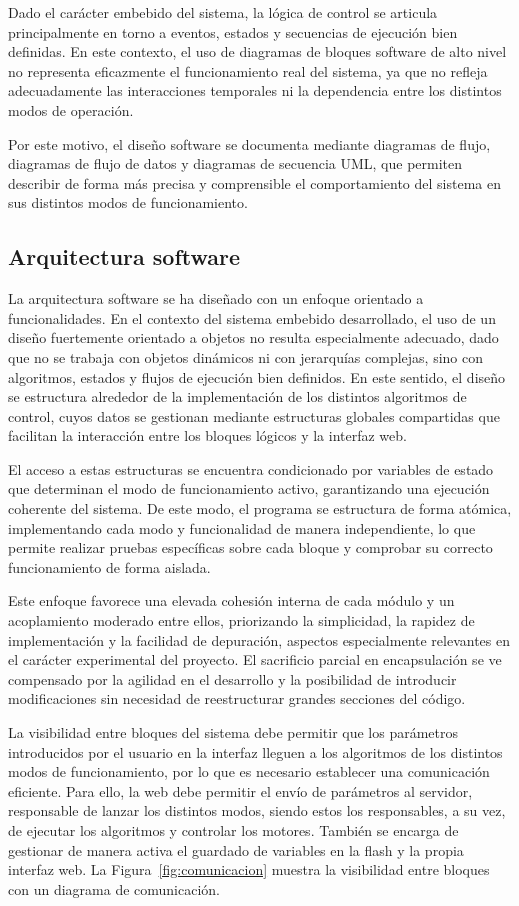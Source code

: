 Dado el carácter embebido del sistema, la lógica de control se articula principalmente en torno a eventos, estados y secuencias de ejecución bien definidas. En este contexto, el uso de diagramas de bloques software de alto nivel no representa eficazmente el funcionamiento real del sistema, ya que no refleja adecuadamente las interacciones temporales ni la dependencia entre los distintos modos de operación.

Por este motivo, el diseño software se documenta mediante diagramas de flujo, diagramas de flujo de datos y diagramas de secuencia UML, que permiten describir de forma más precisa y comprensible el comportamiento del sistema en sus distintos modos de funcionamiento.

\subsection{Arquitectura software}
La arquitectura software se ha diseñado con un enfoque orientado a funcionalidades. En el contexto del sistema embebido desarrollado, el uso de un diseño fuertemente orientado a objetos no resulta especialmente adecuado, dado que no se trabaja con objetos dinámicos ni con jerarquías complejas, sino con algoritmos, estados y flujos de ejecución bien definidos. En este sentido, el diseño se estructura alrededor de la implementación de los distintos algoritmos de control, cuyos datos se gestionan mediante estructuras globales compartidas que facilitan la interacción entre los bloques lógicos y la interfaz web.

El acceso a estas estructuras se encuentra condicionado por variables de estado que determinan el modo de funcionamiento activo, garantizando una ejecución coherente del sistema. De este modo, el programa se estructura de forma atómica, implementando cada modo y funcionalidad de manera independiente, lo que permite realizar pruebas específicas sobre cada bloque y comprobar su correcto funcionamiento de forma aislada.

Este enfoque favorece una elevada cohesión interna de cada módulo y un acoplamiento moderado entre ellos, priorizando la simplicidad, la rapidez de implementación y la facilidad de depuración, aspectos especialmente relevantes en el carácter experimental del proyecto. El sacrificio parcial en encapsulación se ve compensado por la agilidad en el desarrollo y la posibilidad de introducir modificaciones sin necesidad de reestructurar grandes secciones del código.

La visibilidad entre bloques del sistema debe permitir que los parámetros introducidos por el usuario en la interfaz lleguen a los algoritmos de los distintos modos de funcionamiento, por lo que es necesario establecer una comunicación eficiente. Para ello, la web debe permitir el envío de parámetros al servidor, responsable de lanzar los distintos modos, siendo estos los responsables, a su vez, de ejecutar los algoritmos y controlar los motores. También se encarga de gestionar de manera activa el guardado de variables en la flash y la propia interfaz web. La Figura~\ref{fig:comunicacion} muestra la visibilidad entre bloques con un diagrama de comunicación.

